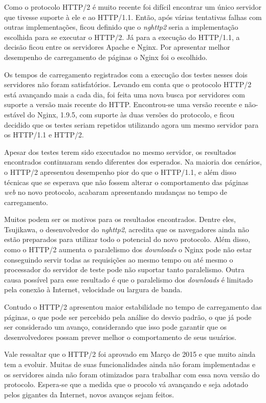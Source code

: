 Como o protocolo HTTP/2 é muito recente foi difícil encontrar um único servidor que tivesse suporte à ele e ao HTTP/1.1. Então, após várias tentativas falhas com outras implementações, ficou definido que o \textit{nghttp2} seria a implementação escolhida para se executar o HTTP/2. Já para a execução do HTTP/1.1, a decisão ficou entre os servidores Apache e Nginx. Por apresentar melhor desempenho de carregamento de páginas o Nginx foi o escolhido.

Os tempos de carregamento registrados com a execução dos testes nesses dois servidores não foram satisfatórios. Levando em conta que o protocolo HTTP/2 está avançando mais a cada dia, foi feita uma nova busca por servidores com suporte a versão mais recente do HTTP. Encontrou-se uma versão recente e não-estável do Nginx, 1.9.5, com suporte às duas versões do protocolo, e ficou decidido que os testes seriam repetidos utilizando agora um mesmo servidor para os HTTP/1.1 e HTTP/2.

Apesar dos testes terem sido executados no mesmo servidor, os resultados encontrados continuaram sendo diferentes dos esperados. Na maioria dos cenários, o HTTP/2 apresentou desempenho pior do que o HTTP/1.1, e além disso técnicas que se esperava que não fossem alterar o comportamento das páginas \textit{web} no novo protocolo, acabaram apresentando mudanças no tempo de carregamento.

Muitos podem ser os motivos para os resultados encontrados. Dentre eles, Tsujikawa, o desenvolvedor do \textit{nghttp2}, acredita que os navegadores ainda não estão preparados para utilizar todo o potencial do novo protocolo. Além disso, como o HTTP/2 aumenta o paralelismo dos \textit{downloads} o Nginx pode não estar conseguindo servir todas as requisições ao mesmo tempo ou até mesmo o processador do servidor de teste pode não suportar tanto paralelismo. Outra causa possível para esse resultado é que o paralelismo dos \textit{downloads} é limitado pela conexão à Internet, velocidade ou largura de banda.

Contudo o HTTP/2 apresentou maior estabilidade no tempo de carregamento das páginas, o que pode ser percebido pela análise do desvio padrão, o que já pode ser considerado um avanço, considerando que isso pode garantir que os desenvolvedores possam prever melhor o comportamento de seus usuários.

Vale ressaltar que o HTTP/2 foi aprovado em Março de 2015 e que muito ainda tem a evoluir. Muitas de suas funcionalidades ainda não foram implementadas e os servidores ainda não foram otimizados para trabalhar com essa nova versão do protocolo. Espera-se que a medida que o procolo vá avançando e seja adotado pelos gigantes da Internet, novos avanços sejam feitos.

